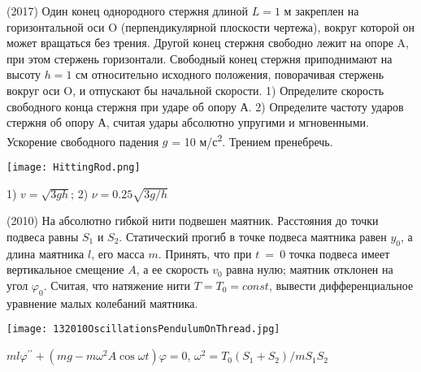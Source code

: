 \begin{ex}
(2017) Один конец однородного стержня длиной $L=1$ м закреплен на горизонтальной оси O (перпендикулярной плоскости чертежа), вокруг которой он может вращаться без трения. Другой конец стержня свободно лежит на опоре A, при этом стержень горизонтали. Свободный конец стержня приподнимают на высоту $h = 1$ см относительно исходного положения, поворачивая стержень
вокруг оси O, и отпускают бы начальной скорости. 1) Определите скорость
свободного конца стержня при ударе об опору А. 2) Определите частоту ударов
стержня об опору А, считая удары абсолютно упругими и мгновенными.
Ускорение свободного падения $g$ = 10 м/с\textsuperscript{2}. Трением пренебречь.
\begin{center}
\texttt{[image: HittingRod.png]}
\end{center}
\begin{ans}
1) $v=\sqrt{3gh}$; 2) $\nu = 0.25\sqrt{3g/h }$
\end{ans}
\end{ex}

\begin{ex}
(2010) На абсолютно гибкой нити подвешен маятник. Расстояния до точки подвеса равны $S_1$ и $S_2$. 
Статический прогиб в точке подвеса маятника равен $y_0$, а длина маятника $l$, его масса $m$. 
Принять, что при $t$~=~0 точка подвеса имеет вертикальное смещение $A$, а ее скорость $v_0$ равна нулю; маятник отклонен на угол $\varphi_0$. 
Считая, что натяжение нити $T = T_0 = const$, вывести дифференциальное уравнение малых колебаний маятника.
\begin{center}
\texttt{[image: 132010OscillationsPendulumOnThread.jpg]}
\end{center}
\begin{ans}
$ml \varphi^{\prime \prime} + (mg-m \omega^2 A \cos \omega t) \varphi = 0$, $\omega^2 = T_0(S_1+S_2)/m S_1 S_2$
\end{ans}
\end{ex}

